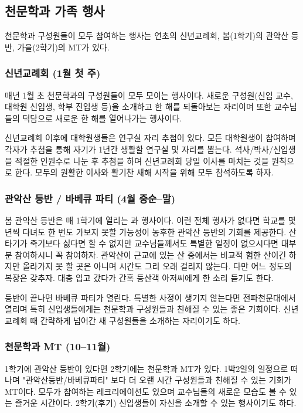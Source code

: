 \subsection{천문학과 가족 행사}
천문학과 구성원들이 모두 참여하는 행사는 연초의 신년교례회, 봄(1학기)의 관악산
등반, 가을(2학기)의 MT가 있다.

\subsubsection{신년교례회 (1월 첫 주)}
매년 1월 초 천문학과의 구성원들이 모두 모이는 행사이다. 새로운 구성원(신임 교수,
대학원 신입생, 학부 진입생 등)을 소개하고 한 해를 되돌아보는 자리이며 또한
교수님들의 덕담으로 새로운 한 해를 열어나가는 행사이다.

신년교례회 이후에 대학원생들은 연구실 자리 추첨이 있다. 모든 대학원생이 참여하며
각자가 추첨을 통해 자기가 1년간 생활할 연구실 및 자리를
뽑는다. 석사/박사/신입생을 적절한 인원수로 나눈 후 추첨을 하며 신년교례회 당일
이사를 마치는 것을 원칙으로 한다. 모두의 원활한 이사와 활기찬 새해 시작을 위해
모두 참석하도록 하자.

\subsubsection{관악산 등반 / 바베큐 파티 (4월 중순--말)}
봄 관악산 등반은 매 1학기에 열리는 과 행사이다. 이런 전체 행사가 없다면 학교를 몇
년씩 다녀도 한 번도 가보지 못할 가능성이 농후한 관악산 등반의 기회를 제공한다. 산
타기가 죽기보다 싫다면 할 수 없지만 교수님들께서도 특별한 일정이 없으시다면
대부분 참여하시니 꼭 참여하자.  관악산이 근교에 있는 산 중에서는 비교적 험한
산이긴 하지만 올라가지 못 할 곳은 아니며 시간도 그리 오래 걸리지 않는다. 다만
어느 정도의 복장은 갖추자. 대충 입고 갔다가 간혹 등산객 아저씨에게 한 소리 듣기도
한다.

등반이 끝나면 바베큐 파티가 열린다. 특별한 사정이 생기지 않는다면 전파천문대에서
열리며 특히 신입생들에게는 천문학과 구성원들과 친해질 수 있는 좋은
기회이다. 신년교례회 때 간략하게 넘어간 새 구성원들을 소개하는 자리이기도 하다.

\subsubsection{천문학과 MT (10--11월)}
1학기에 관악산 등반이 있다면 2학기에는 천문학과 MT가 있다. 1박2일의 일정으로
떠나며 "관악산등반/바베큐파티" 보다 더 오랜 시간 구성원들과 친해질 수 있는 기회가
MT이다. 모두가 참여하는 레크리에이션도 있으며 교수님들의 새로운 모습도 볼 수 있는
즐거운 시간이다. 2학기(후기) 신입생들이 자신을 소개할 수 있는 행사이기도 하다.

